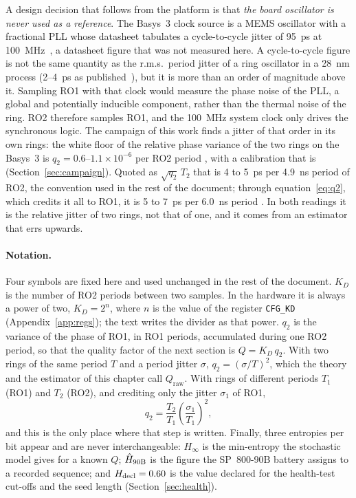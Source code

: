 A design decision that follows from the platform is that \emph{the board
oscillator is never used as a reference}. The Basys~3 clock source is a
MEMS oscillator with a fractional \ac{PLL} whose datasheet tabulates a
cycle-to-cycle jitter of 95~ps at 100~MHz~\cite{micrel_dsc1033,
digilent_2014_basys3rm}, a datasheet figure that was not measured here.
A cycle-to-cycle figure is not the same quantity as the r.m.s.\ period
jitter of a ring oscillator in a 28~nm process (2--4~ps as
published~\cite{petura_2016_survey}), but it is more than an order of
magnitude above it.
Sampling RO1 with that clock would measure the phase noise of the PLL,
a global and potentially inducible component, rather than the thermal
noise of the ring. RO2 therefore samples RO1, and the 100~MHz system
clock only drives the synchronous logic. The campaign of this work finds
a jitter of that order in its own rings: the white floor of the relative
phase variance of the two rings on the Basys~3 is
$q_2 = 0.6$--$1.1\times10^{-6}$ per RO2 period \meas{}, with a
calibration that is \simu{} (Section~\ref{sec:campaign}). Quoted as
$\sqrt{q_2}\,T_2$ that is 4 to 5~ps per 4.9~ns period of RO2, the
convention used in the rest of the document; through
equation~\eqref{eq:q2}, which credits it all to RO1, it is 5 to 7~ps per
6.0~ns period \est{}. In both readings it is the relative jitter of two
rings, not that of one, and it comes from an estimator that errs upwards.

\paragraph{Notation.} Four symbols are fixed here and used unchanged in
the rest of the document. $K_D$ is the number of RO2 periods between two
samples. In the hardware it is always a power of two, $K_D = 2^{n}$,
where $n$ is the value of the register \texttt{CFG\_KD}
(Appendix~\ref{app:regs}); the text writes the divider as that power.
$q_2$ is the variance of the phase of RO1, in RO1 periods, accumulated
during one RO2 period, so that the quality factor of the next section is
$Q = K_D\,q_2$. With two rings of the same period $T$ and a period jitter
$\sigma$, $q_2 = (\sigma/T)^2$, which the theory and the estimator of this
chapter call $Q_{\mathrm{raw}}$. With rings of different periods $T_1$
(RO1) and $T_2$ (RO2), and crediting only the jitter $\sigma_1$ of RO1,
\begin{equation}
  q_2 = \frac{T_2}{T_1}\left(\frac{\sigma_1}{T_1}\right)^{2} ,
  \label{eq:q2}
\end{equation}
and this is the only place where that step is written. Finally, three
entropies per bit appear and are never interchangeable: $H_\infty$ is the
min-entropy the stochastic model gives for a known $Q$; $\hat{H}_{\mathrm{90B}}$ is the
figure the SP~800-90B battery assigns to a recorded sequence; and
$H_{\mathrm{decl}} = 0.60$ is the value declared for the health-test cut-offs and
the seed length (Section~\ref{sec:health}).

